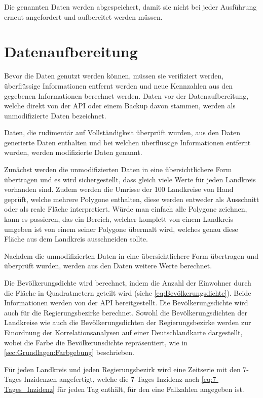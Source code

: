 Die genannten Daten werden abgespeichert, damit sie nicht bei jeder Ausführung erneut angefordert und aufbereitet werden müssen.
\section{Datenaufbereitung}
Bevor die Daten genutzt werden können, müssen sie verifiziert werden, überflüssige Informationen entfernt werden und neue Kennzahlen aus den gegebenen Informationen berechnet werden. Daten vor der Datenaufbereitung, welche direkt von der API oder einem Backup davon stammen, werden als \glqq{}unmodifizierte\grqq{} Daten bezeichnet. 

Daten, die rudimentär auf Vollständigkeit überprüft wurden, aus den Daten generierte Daten enthalten und bei welchen überflüssige Informationen entfernt wurden, werden \glqq{}modifizierte\grqq{} Daten genannt.

Zunächst werden die unmodifizierten Daten in eine übersichtlichere Form übertragen und es wird sichergestellt, dass gleich viele Werte für jeden Landkreis vorhanden sind. Zudem werden die Umrisse der 100 Landkreise von Hand geprüft, welche mehrere Polygone enthalten, diese werden entweder als Ausschnitt oder als reale Fläche interpretiert. Würde man einfach alle Polygone zeichnen, kann es passieren, das ein Bereich, welcher komplett von einem Landkreis umgeben ist von einem seiner Polygone übermalt wird, welches genau diese Fläche aus dem Landkreis ausschneiden sollte.

Nachdem die unmodifizierten Daten in eine übersichtlichere Form übertragen und überprüft wurden, werden aus den Daten weitere Werte berechnet.

Die Bevölkerungsdichte wird berechnet, indem die Anzahl der Einwohner durch die Fläche in Quadratmetern geteilt wird (siehe \autoref{eq:Bevölkerungsdichte}). Beide Informationen werden von der API bereitgestellt.
Die Bevölkerungsdichte wird auch für die Regierungsbezirke berechnet. 
Sowohl die Bevölkerungsdichten der Landkreise wie auch die Bevölkerungsdichten der Regierungsbezirke werden zur Einordnung der Korrelationsanalysen auf einer Deutschlandkarte dargestellt, wobei die Farbe die Bevölkerunsdichte repräsentiert, wie in \autoref{sec:Grundlagen:Farbgebung} beschrieben.

Für jeden Landkreis und jeden Regierungsbezirk wird eine Zeitserie mit den 7-Tages Inzidenzen angefertigt, welche die 7-Tages Inzidenz nach \autoref{eq:7-Tages_Inzidenz} für jeden Tag enthält, für den eine Fallzahlen angegeben ist. 

